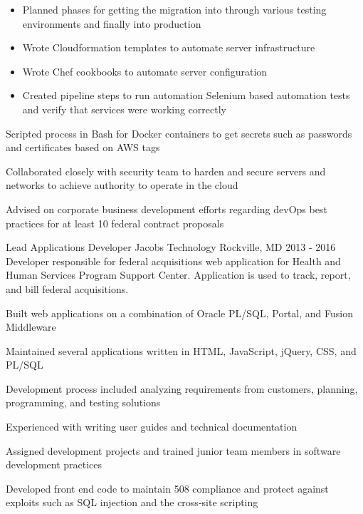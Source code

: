 \begin{cventries}
{\begin{cvitems}
\begin{itemize}
          \item {Planned phases for getting the migration into through various testing environments and finally into production}
          \item {Wrote Cloudformation templates to automate server infrastructure}
          \item {Wrote Chef cookbooks to automate server configuration}
          \item {Created pipeline steps to run automation Selenium based automation tests and verify that services were working correctly}
        \end{itemize}
        \item {Scripted process in Bash for Docker containers to get secrets such as passwords and certificates based on AWS tags}
        \item {Collaborated closely with security team to harden and secure servers and networks to achieve authority to operate in the cloud}
        \item {Advised on corporate business development efforts regarding devOps best practices for at least 10 federal contract proposals}
      \end{cvitems}
    }


  \cventry
    {Lead Applications Developer} %
    {Jacobs Technology} %
    {Rockville, MD} %
    {2013 - 2016} %
    {Developer responsible for federal acquisitions web application for Health and Human Services Program Support Center. Application is used to track, report, and bill federal acquisitions.} %
    {
      \begin{cvitems} %
        \item {Built web applications on a combination of Oracle PL/SQL, Portal, and Fusion Middleware}
        \item {Maintained several applications written in HTML, JavaScript, jQuery, CSS, and PL/SQL}
        \item {Development process included analyzing requirements from customers, planning, programming, and testing solutions}
        \item {Experienced with writing user guides and technical documentation}
        \item {Assigned development projects and trained junior team members in software development practices}
        \item {Developed front end code to maintain 508 compliance and protect against exploits such as SQL injection and the cross-site scripting}
      \end{cvitems}
    }


\end{cventries}
